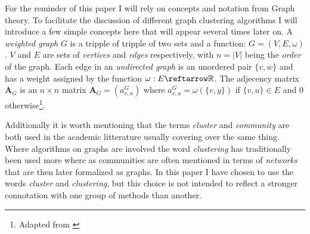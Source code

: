 For the reminder of this paper I will rely on concepts and notation from 
Graph theory. To facilitate the discussion of different graph clustering 
algorithms I will introduce a few simple concepts here that will appear 
several times later on. A \emph{weighted graph} $G$ is a tripple of 
tripple of two sets and a function: $G = (V, E, \omega)$. $V$ and $E$ 
are sets of \emph{vertices} and \emph{edges} respectively, with $n = 
|V|$ being the \emph{order} of the graph. Each edge in an 
\emph{undirected graph} is an unordered pair $\{v, w\}$ and has a weight 
assigned by the function $\omega : E \reftarrow \mathbb{R}$. The 
adjecency matrix $\textbf{A}_G$ is an $n \times n$ matrix $\textbf{A}_G 
= (a_{v,u}^G)$ where $a_{v,u}^G = \omega(\{v,y\})$ if $\{v,u\} \in E$ 
and $0$ otherwise\footnote{Adapted from \cite{shaeffer2007}}.

Additionally it is worth mentioning that the terms \emph{cluster} and 
\emph{community} are both used in the academic litterature usually 
covering over the same thing. Where algorithms on graphs are involved 
the word \emph{clustering} has traditionally been used more where as 
communities are often mentioned in terms of \emph{networks} that are 
then later formalized as graphs. In this paper I have chosen to use the 
words \emph{cluster} and \emph{clustering}, but this choice is not 
intended to reflect a stronger connotation with one group of methods 
than another.
